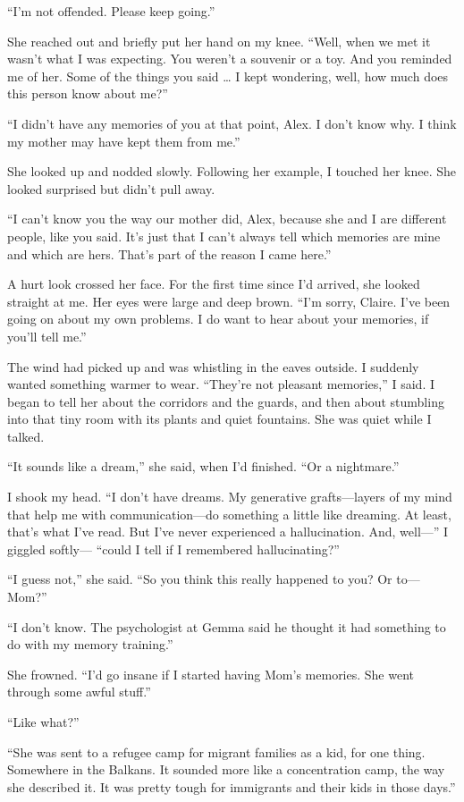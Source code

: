 \documentclass[10pt,b5paper]{article}
\begin{document}
``I'm not offended. Please keep going.''

She reached out and briefly put her hand on my knee. ``Well, when
we met it wasn't what I was expecting. You weren't a souvenir or a
toy. And you reminded me of her. Some of the things you said \ldots
I kept wondering, well, how much does this person know about me?''

``I didn't have any memories of you at that point, Alex.  I don't
know why. I think my mother may have kept them from me.''

She looked up and nodded slowly. Following her example, I touched
her knee. She looked surprised but didn't pull away.

``I can't know you the way our mother did, Alex, because she and I
are different people, like you said. It's just that I can't always
tell which memories are mine and which are hers. That's part of the
reason I came here.''

A hurt look crossed her face. For the first time since I'd arrived,
she looked straight at me. Her eyes were large and deep brown. ``I'm
sorry, Claire. I've been going on about my own problems. I do want
to hear about your memories, if you'll tell me.''

The wind had picked up and was whistling in the eaves outside. I
suddenly wanted something warmer to wear. ``They're not pleasant
memories,'' I said. I began to tell her about the corridors and the
guards, and then about stumbling into that tiny room with its plants
and quiet fountains. She was quiet while I talked.

``It sounds like a dream,'' she said, when I'd finished. ``Or a
nightmare.''

I shook my head. ``I don't have dreams. My generative grafts---layers
of my mind that help me with communication---do something a little
like dreaming. At least, that's what I've read. But I've never
experienced a hallucination. And, well---'' I giggled softly---
``could I tell if I remembered hallucinating?''

``I guess not,'' she said. ``So you think this really happened to you?
Or to---Mom?''

``I don't know. The psychologist at Gemma said he thought it had
something to do with my memory training.''

She frowned. ``I'd go insane if I started having Mom's memories. She
went through some awful stuff.''

``Like what?''

``She was sent to a refugee camp for migrant families as a kid,
for one thing. Somewhere in the Balkans. It sounded more like a
concentration camp, the way she described it. It was pretty tough
for immigrants and their kids in those days.''
\end{document}
